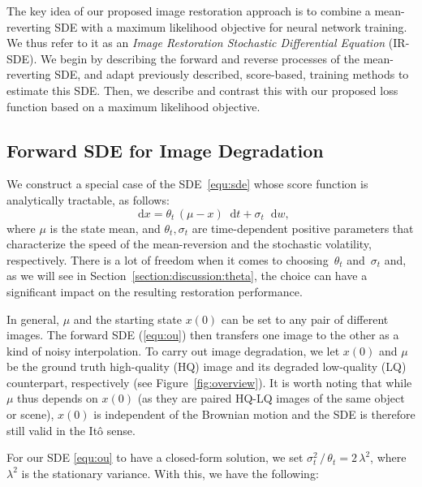\documentclass{article}
\newcommand{\diff}{\mathop{}\!\mathrm{d}}
\theoremstyle{plain}
\theoremstyle{definition}
\theoremstyle{remark}
\begin{document}
The key idea of our proposed image restoration approach is to combine a mean-reverting SDE with a maximum likelihood objective for neural network training. We thus refer to it as an \emph{Image Restoration Stochastic Differential Equation} (IR-SDE). We begin by describing the forward and reverse processes of the mean-reverting SDE, and adapt previously described, score-based, training methods to estimate this SDE. Then, we describe and contrast this with our proposed loss function based on a maximum likelihood objective.




\subsection{Forward SDE for Image Degradation}


We construct a special case of the SDE~\eqref{equ:sde} whose score function is analytically tractable, as follows:
\begin{equation}
	\diff {x} = \theta_t \, (\mu - {x}) \diff t + \sigma_t \diff w,
	\label{equ:ou}
\end{equation}
where $\mu$ is the state mean, and $\theta_t, \sigma_t$ are time-dependent positive parameters that characterize the speed of the mean-reversion and the stochastic volatility, respectively. There is a lot of freedom when it comes to choosing~$\theta_t$ and~$\sigma_t$ and, as we will see in Section~\ref{section:discussion:theta}, the choice can have a significant impact on the resulting restoration performance. 

In general, $\mu$ and the starting state ${x}(0)$ can be set to any pair of different images. The forward SDE (\ref{equ:ou}) then transfers one image to the other as a kind of noisy interpolation. To carry out image degradation, we let ${x}(0)$ and $\mu$ be the ground truth high-quality (HQ) image and its degraded low-quality (LQ) counterpart, respectively (see Figure~\ref{fig:overview}). It is worth noting that while $\mu$ thus depends on ${x}(0)$ (as they are paired HQ-LQ images of the same object or scene), ${x}(0)$ is independent of the Brownian motion and the SDE is therefore still valid in the It\^{o} sense.

For our SDE \eqref{equ:ou} to have a closed-form solution, we set $\sigma_t^2 \, / \, \theta_t = 2 \, \lambda^2$, where $\lambda^2$ is the stationary variance. With this, we have the following:
\end{document}
